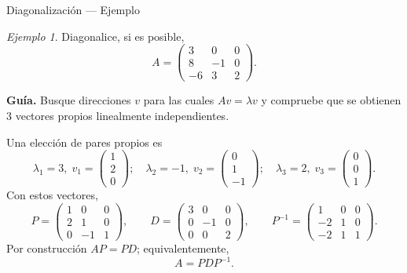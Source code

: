\documentclass[aspectratio=169,11pt]{beamer}
\theoremstyle{remark}
\newtheorem{Ejem}[definicion]{Ejemplo}
\providecommand{\paragraph}[1]{\medskip\textbf{#1.}\enspace}
\begin{document}
\begin{frame}[shrink=5]{Diagonalización — Ejemplo}
\footnotesize
\begin{Ejem}


Diagonalice, si es posible,
\[
A=\begin{pmatrix}3 & 0 & 0\\8 & -1 & 0\\-6 & 3 & 2\end{pmatrix}.
\]

\paragraph{Guía}
Busque direcciones $v$ para las cuales $Av=\lambda v$ y compruebe que se obtienen $3$ vectores propios linealmente independientes.

\scriptsize
Una elección de pares propios es
\[
\lambda_1=3,\;v_1=\begin{pmatrix}1\\2\\0\end{pmatrix};\quad \lambda_2=-1,\;v_2=\begin{pmatrix}0\\1\\-1\end{pmatrix};\quad \lambda_3=2,\;v_3=\begin{pmatrix}0\\0\\1\end{pmatrix}.
\]
Con estos vectores,
\[
P=\begin{pmatrix}1 & 0 & 0\\2 & 1 & 0\\0 & -1 & 1\end{pmatrix},\qquad D=\begin{pmatrix}3 & 0 & 0\\0 & -1 & 0\\0 & 0 & 2\end{pmatrix},\qquad P^{-1}=\begin{pmatrix}1 & 0 & 0\\-2 & 1 & 0\\-2 & 1 & 1\end{pmatrix}.
\]
Por construcción $AP=PD$; equivalentemente,
\[
\boxed{A=PDP^{-1}}.
\]

\end{Ejem}
\end{frame}
\end{document}
